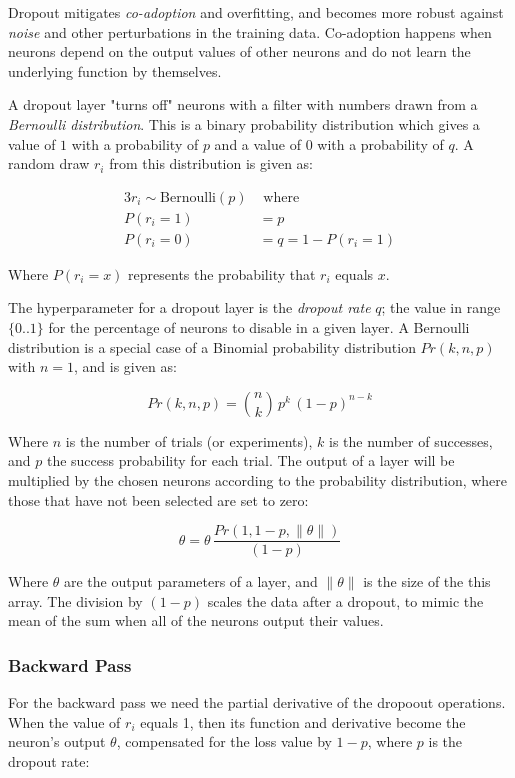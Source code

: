 \documentclass[a4paper]{article}
\begin{document}
Dropout mitigates \emph{co-adoption} and overfitting, and becomes more robust against \emph{noise} and other perturbations in the training data. Co-adoption happens when neurons depend on the output values of other neurons and do not learn the underlying function by themselves.

A dropout layer "turns off" neurons with a filter with numbers drawn from a \emph{Bernoulli distribution}. This is a binary probability distribution which gives a value of $1$ with a probability of $p$ and a value of $0$ with a probability of $q$. A random draw $r_i$ from this distribution is given as:

\begin{alignat*}{3}
    r_i \sim \text{Bernoulli}(p) &\text{ where } \\
    P(r_i=1) &= p \\
    P(r_i=0) &= q = 1 - P(r_i=1)
\end{alignat*}

Where $P(r_i=x)$ represents the probability that $r_i$ equals $x$.

The hyperparameter for a dropout layer is the \emph{dropout rate} $q$; the value in range $\{0..1\}$ for the percentage of neurons to disable in a given layer. A Bernoulli distribution is a special case of a Binomial probability distribution $Pr(k,n,p)$ with $n=1$, and is given as:

\begin{equation*}
    Pr(k,n,p) = \binom{n}{k} \, p^k \, (1-p)^{n-k}
\end{equation*}

Where $n$ is the number of trials (or experiments), $k$ is the number of successes, and $p$ the success probability for each trial. The output of a layer will be multiplied by the chosen neurons according to the probability distribution, where those that have not been selected are set to zero:

\begin{equation*}
    \theta = \theta \, \frac{Pr(1, 1-p, \|\theta\|)}{(1-p)}
\end{equation*}

Where $\theta$ are the output parameters of a layer, and $\|\theta\|$ is the size of the this array. The division by $(1-p)$ scales the data after a dropout, to mimic the mean of the sum when all of the neurons output their values.

\subsubsection*{Backward Pass}
For the backward pass we need the partial derivative of the dropoout operations. When the value of $r_i$ equals 1, then its function and derivative become the neuron's output $\theta$, compensated for the loss value by $1-p$, where $p$ is the dropout rate:
\end{document}
